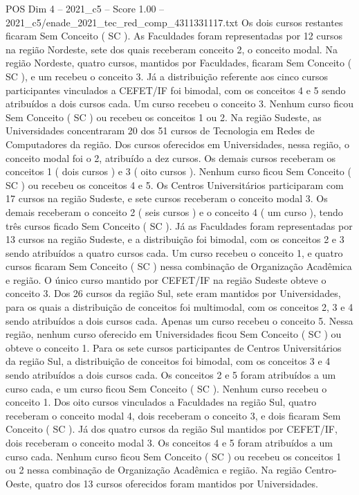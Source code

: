 \begin{textsample}{POS Dim 4 – 2021\_c5 – Score 1.00 – 2021\_c5/enade\_2021\_tec\_red\_comp\_4311331117.txt}
Os dois cursos restantes ficaram Sem Conceito ( SC ).
As Faculdades foram representadas por 12 cursos na região Nordeste, sete dos quais receberam conceito 2, o conceito modal.
Na região Nordeste, quatro cursos, mantidos por Faculdades, ficaram Sem Conceito ( SC ), e um recebeu o conceito 3.
Já a distribuição referente aos cinco cursos participantes vinculados a CEFET/IF foi bimodal, com os conceitos 4 e 5 sendo atribuídos a dois cursos cada.
Um curso recebeu o conceito 3.
Nenhum curso ficou Sem Conceito ( SC ) ou recebeu os conceitos 1 ou 2.
Na região Sudeste, as Universidades concentraram 20 dos 51 cursos de Tecnologia em Redes de Computadores da região.
Dos cursos oferecidos em Universidades, nessa região, o conceito modal foi o 2, atribuído a dez cursos.
Os demais cursos receberam os conceitos 1 ( dois cursos ) e 3 ( oito cursos ).
Nenhum curso ficou Sem Conceito ( SC ) ou recebeu os conceitos 4 e 5.
Os Centros Universitários participaram com 17 cursos na região Sudeste, e sete cursos receberam o conceito modal 3.
Os demais receberam o conceito 2 ( seis cursos ) e o conceito 4 ( um curso ), tendo três cursos ficado Sem Conceito ( SC ).
Já as Faculdades foram representadas por 13 cursos na região Sudeste, e a distribuição foi bimodal, com os conceitos 2 e 3 sendo atribuídos a quatro cursos cada.
Um curso recebeu o conceito 1, e quatro cursos ficaram Sem Conceito ( SC ) nessa combinação de Organização Acadêmica e região.
O único curso mantido por CEFET/IF na região Sudeste obteve o conceito 3.
Dos 26 cursos da região Sul, sete eram mantidos por Universidades, para os quais a distribuição de conceitos foi multimodal, com os conceitos 2, 3 e 4 sendo atribuídos a dois cursos cada.
Apenas um curso recebeu o conceito 5.
Nessa região, nenhum curso oferecido em Universidades ficou Sem Conceito ( SC ) ou obteve o conceito 1.
Para os sete cursos participantes de Centros Universitários da região Sul, a distribuição de conceitos foi bimodal, com os conceitos 3 e 4 sendo atribuídos a dois cursos cada.
Os conceitos 2 e 5 foram atribuídos a um curso cada, e um curso ficou Sem Conceito ( SC ).
Nenhum curso recebeu o conceito 1.
Dos oito cursos vinculados a Faculdades na região Sul, quatro receberam o conceito modal 4, dois receberam o conceito 3, e dois ficaram Sem Conceito ( SC ).
Já dos quatro cursos da região Sul mantidos por CEFET/IF, dois receberam o conceito modal 3.
Os conceitos 4 e 5 foram atribuídos a um curso cada.
Nenhum curso ficou Sem Conceito ( SC ) ou recebeu os conceitos 1 ou 2 nessa combinação de Organização Acadêmica e região.
Na região Centro-Oeste, quatro dos 13 cursos oferecidos foram mantidos por Universidades.

\end{textsample}
